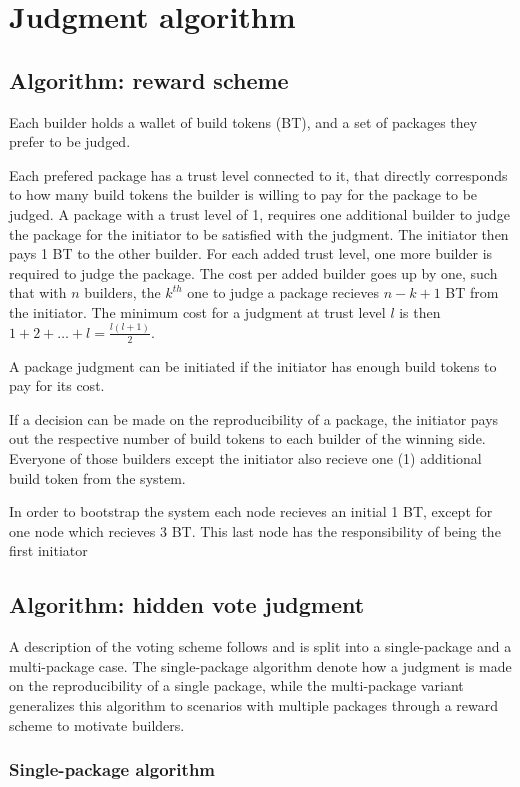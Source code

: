 \chapter{Judgment algorithm}


\section{Algorithm: reward scheme}
Each builder holds a wallet of build tokens (BT), and a set of packages they prefer to be judged.

Each prefered package has a trust level connected to it, that directly corresponds to how many build tokens the builder is willing to pay for the package to be judged. A package with a trust level of 1, requires one additional builder to judge the package for the initiator to be satisfied with the judgment. The initiator then pays 1 BT to the other builder. For each added trust level, one more builder is required to judge the package. The cost per added builder goes up by one, such that with $n$ builders, the $k^{th}$ one to judge a package recieves $n - k + 1$ BT from the initiator. The minimum cost for a judgment at trust level $l$ is then $1 + 2 + \dotsc + l = \frac{l(l+1)}{2}$.

A package judgment can be initiated if the initiator has enough build tokens to pay for its cost.

If a decision can be made on the reproducibility of a package, the initiator pays out the respective number of build tokens to each builder of the winning side. Everyone of those builders except the initiator also recieve one (1) additional build token from the system.

In order to bootstrap the system each node recieves an initial 1 BT, except for one node which recieves 3 BT. This last node has the responsibility of being the first initiator

\section{Algorithm: hidden vote judgment}

A description of the voting scheme follows and is split into a single-package and a multi-package case. The single-package algorithm denote how a judgment is made on the reproducibility of a single package, while the multi-package variant generalizes this algorithm to scenarios with multiple packages through a reward scheme to motivate builders.

\subsection{Single-package algorithm}

